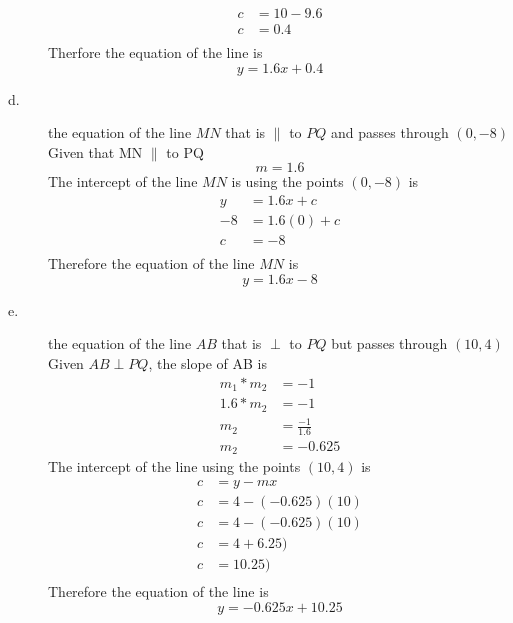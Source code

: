 \documentclass{article}
\begin{document}
\begin{description}
$$\begin{aligned}
                c & = 10 - 9.6      \\
                c & = 0.4           \\
            \end{aligned}
        $$
        Therfore the equation of the line is
        $$
            y = 1.6x + 0.4
        $$
    \item[d.] the equation of the line $MN$ that is $\parallel$ to $PQ$ and passes through $(0, -8)$
        Given that MN $\parallel$ to PQ
        $$
            m = 1.6
        $$
        The intercept of the line $MN$ is using the points $(0,-8)$ is
        $$
            \begin{aligned}
                y  & = 1.6x + c   \\
                -8 & = 1.6(0) + c \\
                c  & = -8         \\
            \end{aligned}
        $$
        Therefore the equation of the line $MN$ is
        $$
            y = 1.6x-8
        $$
    \item[e.] the equation of the line $AB$ that is $\perp$ to $PQ$ but passes through $(10, 4)$
        Given $AB \perp PQ$, the slope of AB is
        $$
            \begin{aligned}
                m_1 * m_2 & = -1             \\
                1.6* m_2  & = -1             \\
                m_2       & = \frac{-1}{1.6} \\
                m_2       & = -0.625
            \end{aligned}
        $$
        The intercept of the line using the points $(10, 4)$ is
        $$
            \begin{aligned}
                c & = y - mx           \\
                c & = 4 - (-0.625)(10) \\
                c & = 4 - (-0.625)(10) \\
                c & = 4 + 6.25)        \\
                c & = 10.25)           \\
            \end{aligned}
        $$
        Therefore the equation of the line is
        $$
            y = -0.625x+10.25
        $$
\end{description}
\end{document}
